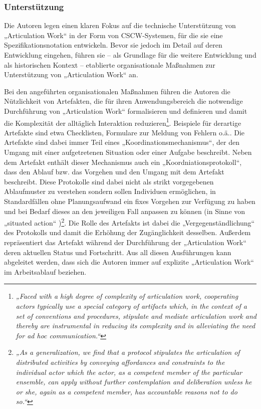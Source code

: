 \subsubsection{Unterstützung}

Die Autoren legen einen klaren Fokus auf die technische Unterstützung von „Articulation Work“ in der Form von \gls{CSCW}-Systemen, für die sie eine Spezifikationsnotation entwickeln. Bevor sie jedoch im Detail auf deren Entwicklung eingehen, führen sie -- als Grundlage für die weitere Entwicklung und als historischen Kontext -- etablierte organisationale Maßnahmen zur Unterstützung von „Articulation Work“ an.

Bei den angeführten organisationalen Maßnahmen führen die Autoren die Nützlichkeit von Artefakten, die für ihren Anwendungsbereich die notwendige Durchführung von „Articulation Work“ formalisieren und definieren und damit die Komplexität der alltäglich Interaktion reduzieren\footnote{\emph{„Faced with a high degree of complexity of articulation work, cooperating actors typically use a special category of artifacts which, in the context of a set of conventions and procedures, stipulate and mediate articulation work and thereby are instrumental in reducing its complexity and in alleviating the need for ad hoc communication.“}\citep[][S. 159]{Schmidt96}}. Beispiele für derartige Artefakte sind etwa Checklisten, Formulare zur Meldung von Fehlern o.ä.. Die Artefakte sind dabei immer Teil eines „Koordinationsmechanismus“, der den Umgang mit einer aufgetretenen Situation oder einer Aufgabe beschreibt. Neben dem Artefakt enthält dieser Mechanismus auch ein „Koordniationsprotokoll“, dass den Ablauf bzw. das Vorgehen und den Umgang mit dem Artefakt beschreibt. Diese Protokolle sind dabei nicht als strikt vorgegebenen Ablaufmuster zu verstehen sondern sollen Individuen ermöglichen, in Standardfällen ohne Planungsaufwand ein fixes Vorgehen zur Verfügung zu haben und bei Bedarf dieses an den jeweiligen Fall anpassen zu können (in Sinne von „situated action“ \citep{Suchman87})\footnote{\emph{„As a generalization, we find that a protocol stipulates the articulation of distributed activities by conveying affordances and constraints to the individual actor which the actor, as a competent member of the particular ensemble, can apply without further contemplation and deliberation unless he or she, again as a competent member, has accountable reasons not to do so.“}\citep[][S. 173]{Schmidt96}}. Die Rolle des Artefakts ist dabei die „Vergegenständlichung“ des Protokolls und damit die Erhöhung der Zugänglichkeit desselben. Außerdem repräsentiert das Artefakt während der Durchführung der „Articulation Work“ deren aktuellen Status und Fortschritt. Aus all diesen Ausführungen kann abgeleitet werden, dass sich die Autoren immer auf explizite „Articulation Work“ im Arbeitsablauf beziehen.

